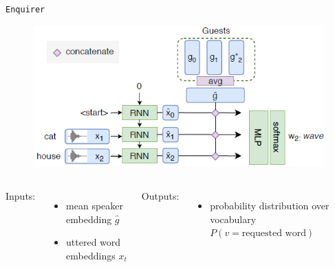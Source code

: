 \documentclass[11pt, aspectratio=169]{beamer}
\newcommand{\enquirer}{\texttt{Enquirer}}
\newcommand{\rimgscale}{0.7}
\begin{document}
\begin{frame}{\enquirer{}}
    \begin{figure}[bht]
        \includegraphics[scale=\rimgscale]{enquirer.png}
    \end{figure}

    \begin{columns}[t]
        Inputs:
        \begin{itemize}
            \item mean speaker embedding $\hat{g}$
            \item uttered word embeddings $x_t$
        \end{itemize}

        Outputs:
        \begin{itemize}
            \item probability distribution over vocabulary $P(v =
            \text{requested word})$
        \end{itemize}
    \end{columns}
\end{frame}
\end{document}
